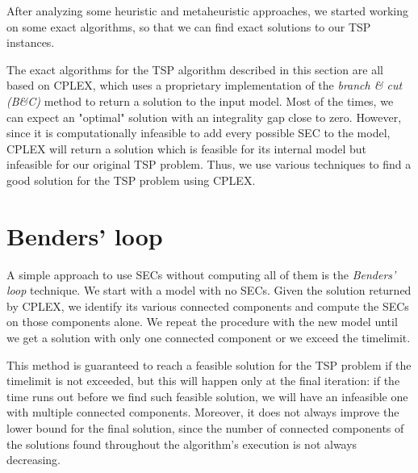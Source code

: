 After analyzing some heuristic and metaheuristic approaches, we started working on some exact algorithms, so that we can find exact solutions to our TSP instances.

The exact algorithms for the TSP algorithm described in this section are all based on CPLEX, which uses a proprietary implementation of the \textit{branch \& cut (B\&C)} method to return a solution to the input model. Most of the times, we can expect an "optimal" solution with an integrality gap close to zero. However, since it is computationally infeasible to add every possible SEC to the model, CPLEX will return a solution which is feasible for its internal model but infeasible for our original TSP problem. Thus, we use various techniques to find a good solution for the TSP problem using CPLEX.

\section{Benders' loop}
A simple approach to use SECs without computing all of them is the \textit{Benders' loop} technique. We start with a model with no SECs. Given the solution returned by CPLEX, we identify its various connected components and compute the SECs on those components alone. We repeat the procedure with the new model until we get a solution with only one connected component or we exceed the timelimit.

This method is guaranteed to reach a feasible solution for the TSP problem if the timelimit is not exceeded, but this will happen only at the final iteration: if the time runs out before we find such feasible solution, we will have an infeasible one with multiple connected components. Moreover, it does not always improve the lower bound for the final solution, since the number of connected components of the solutions found throughout the algorithm's execution is not always decreasing.
\newpage
\FloatBarrier
